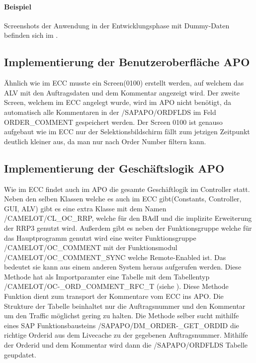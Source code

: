 \paragraph{Beispiel}
Screenshots der Anwendung in der Entwicklungsphase mit Dummy-Daten befinden sich im .

\subsection{Implementierung der Benutzeroberfläche APO}
\label{sec:Implementierung der Benutzeroberfläche APO} 
Ähnlich wie im \ac{ECC} musste ein Screen(0100) erstellt werden, auf welchem das \ac{ALV} mit den Auftragsdaten und dem Kommentar angezeigt wird. Der zweite Screen, welchem im \ac{ECC} angelegt wurde, wird im \ac{APO} nicht benötigt, da automatisch alle Kommentaren in der /SAPAPO/ORDFLDS im Feld ORDER\_COMMENT gespeichert werden. Der Screen 0100 ist genauso aufgebaut wie im \ac{ECC} nur der Selektionsbildschirm fällt zum jetzigen Zeitpunkt deutlich kleiner aus, da man nur nach Order Number filtern kann.  

\subsection{Implementierung der Geschäftslogik APO}
\label{sec:Implementierung der Geschäftslogik APO}  
Wie im \ac{ECC} findet auch im \ac{APO} die gesamte Geschäftlogik im Controller statt. Neben den selben Klassen welche es auch im \ac{ECC} gibt(Constants, Controller, \ac{GUI}, \ac{ALV}) gibt es eine extra Klasse mit dem Namen /CAMELOT/CL\_OC\_RRP, welche für den \ac{BAdI} und die implizite Erweiterung der RRP3 genutzt wird. Außerdem gibt es neben der Funktionsgruppe welche für das Hauptprogramm genutzt wird eine weiter Funktionsgruppe /CAMELOT/OC\_COMMENT mit der Funktionsmodul /CAMELOT/OC\_COMMENT\_SYNC welche Remote-Enabled ist. Das bedeutet sie kann aus einem anderen System heraus aufgerufen werden. Diese Methode hat als Importparamter eine Tabelle mit dem Tabellentyp /CAMELOT/OC-\_ORD\_COMMENT\_RFC\_T (siehe ). Diese Methode Funktion dient zum transport der Kommentare vom \ac{ECC} ins \ac{APO}. Die Strukture der Tabelle beinhaltet nur die Auftragsnummer und den Kommentar um den Traffic möglichst gering zu halten. Die Methode selber sucht mithilfe eines SAP Funktionsbausteins /SAPAPO/DM\_ORDER-\_GET\_ORDID die richtige Orderid aus dem Livecache zu der gegebenen Auftragsnummer. Mithilfe der Orderid und dem Kommentar wird dann die /SAPAPO/ORDFLDS Tabelle geupdatet.  

